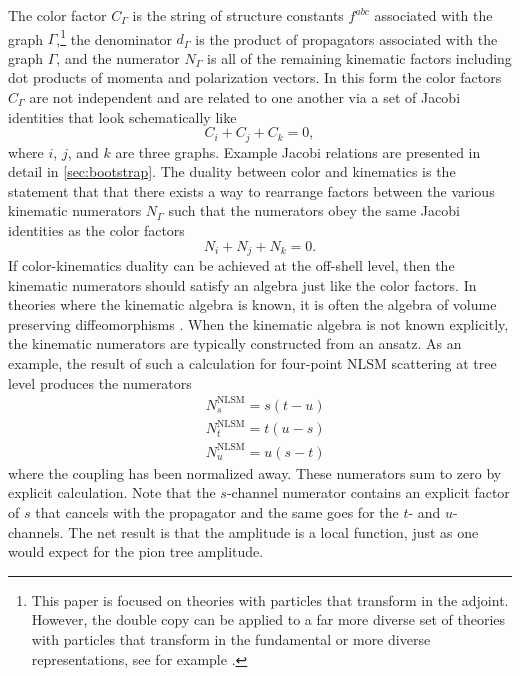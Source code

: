 \documentclass[11pt,letter]{article}
\begin{document}
The color factor
$C_\Gamma$ is the string of structure constants $f^{abc}$ associated
with the graph $\Gamma$,\footnote{This paper is focused on theories
  with particles that transform in the adjoint.  However, the double
  copy can be applied to a far more diverse set of theories with
  particles that transform in the fundamental or more diverse
  representations, see for example \cite{Johansson:2017srf,
    Johansson2014zca, Johansson:2015oia, Johansson:2019dnu, Carrasco:2020ywq,Carrasco:2022jxn,
    Carrasco:2023vjg}.}  the denominator $d_\Gamma$
is the product of propagators associated with the graph $\Gamma$, and
the numerator $N_\Gamma$ is all of the remaining kinematic factors
including dot products of momenta and polarization vectors. In this 
form the color factors $C_\Gamma$ are not independent and are related to
one another via a set of Jacobi identities that look schematically
like
\begin{equation}
C_i+C_j+C_k=0,
\end{equation}
where $i$, $j$, and $k$ are three graphs.  Example Jacobi relations
are presented in detail in \cref{sec:bootstrap}. The duality between color and kinematics is the statement that that there exists a way to rearrange factors between
the various kinematic numerators $N_\Gamma$ such that the numerators
obey the same Jacobi identities as the color factors
\begin{equation}
N_i +N_j +N_k=0.
\end{equation}
If color-kinematics duality can be achieved at the off-shell level,
then the kinematic numerators should satisfy an algebra just like the
color factors.  In theories where the kinematic algebra is known, it
is often the algebra of volume preserving diffeomorphisms
\cite{Monteiro2011pc, Ben-Shahar:2021zww, Cheung:2020djz,
  Cheung:2021zvb, Cheung:2022mix}.
When the kinematic algebra is not known explicitly, the kinematic numerators are typically constructed from an ansatz.
As an example, the result of such a calculation for four-point NLSM scattering at tree level produces the numerators
\begin{align}\label{pionNums}
&N^{\text{NLSM}}_s = s(t-u)\\
&N^{\text{NLSM}}_t = t(u-s)\\
&N^{\text{NLSM}}_u = u(s-t)
\end{align}
where the coupling has been normalized away.  These numerators sum to
zero by explicit calculation.  Note that the $s$-channel numerator
contains an explicit factor of $s$ that cancels with the propagator
and the same goes for the $t$- and $u$-channels.
The net result is that the amplitude is a local function, just as one would expect for the pion tree
amplitude.
\end{document}
